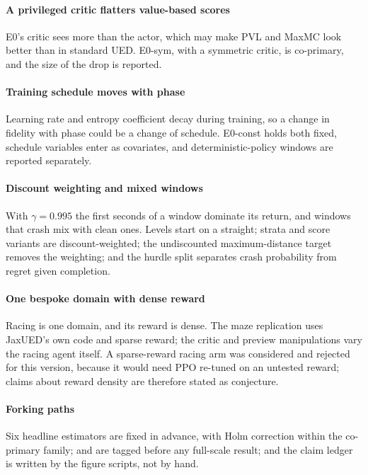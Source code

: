 \paragraph{A privileged critic flatters value-based scores} E0's critic sees more than the
actor, which may make PVL and MaxMC look better than in standard UED. E0-sym, with a
symmetric critic, is co-primary, and the size of the drop is reported.

\paragraph{Training schedule moves with phase} Learning rate and entropy coefficient decay
during training, so a change in fidelity with phase could be a change of schedule. E0-const
holds both fixed, schedule variables enter as covariates, and deterministic-policy windows
are reported separately.

\paragraph{Discount weighting and mixed windows} With $\gamma = 0.995$ the first seconds of
a window dominate its return, and windows that crash mix with clean ones. Levels start on
a straight; strata and score variants are discount-weighted; the undiscounted
maximum-distance target removes the weighting; and the hurdle split separates crash
probability from regret given completion.

\paragraph{One bespoke domain with dense reward} Racing is one domain, and its reward is
dense. The maze replication uses JaxUED's own code and sparse reward; the critic and
preview manipulations vary the racing agent itself. A sparse-reward racing arm was
considered and rejected for this version, because it would need PPO re-tuned on an
untested reward; claims about reward density are therefore stated as conjecture.

\paragraph{Forking paths} Six headline estimators are fixed in advance, with Holm
correction within the co-primary family;  and  are tagged
before any full-scale result; and the claim ledger is written by the figure scripts, not by
hand.

